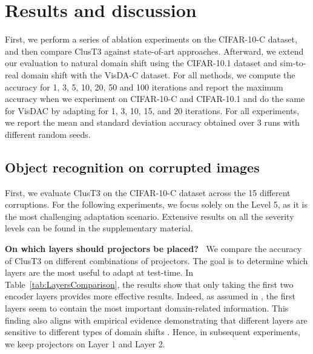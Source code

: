 \documentclass{article}
\newcommand{\mypar}[1]{\vspace{3pt}\noindent\textbf{#1~}}
\begin{document}
\section{Results and discussion}
\label{sec:results}

First, we perform a series of ablation experiments on the CIFAR-10-C dataset, and then compare ClusT3 against state-of-art approaches. Afterward, we extend our evaluation to natural domain shift using the CIFAR-10.1 dataset and sim-to-real domain shift with the VisDA-C dataset. For all methods, we compute the accuracy for 1, 3, 5, 10, 20, 50 and 100 iterations and report the maximum accuracy when we experiment on CIFAR-10-C and CIFAR-10.1 and do the same for VisDAC by adapting for 1, 3, 10, 15, and 20 iterations. For all experiments, we report the mean and standard deviation accuracy obtained over 3 runs with different random seeds.

\subsection{Object recognition on corrupted images}

First, we evaluate ClusT3 on the CIFAR-10-C dataset across the 15 different corruptions. For the following experiments, we focus solely on the Level 5, as it is the most challenging adaptation scenario. Extensive results on all the severity levels can be found in the supplementary material.

\mypar{On which layers should projectors be placed?} We compare the accuracy of ClusT3 on different combinations of projectors. The goal is to determine which layers are the most useful to adapt at test-time. 
In Table~\ref{tab:LayersComparison}, the results show that only taking the first two encoder layers provides more effective results. Indeed, as assumed in \cite{ttt,ttt++,tttflow}, the first layers seem to contain the most important domain-related information. This finding also aligns with empirical evidence demonstrating that different layers are sensitive to different types of domain shifts \cite{surgical}. Hence, in subsequent experiments, we keep projectors on Layer 1 and Layer 2. 
\end{document}
